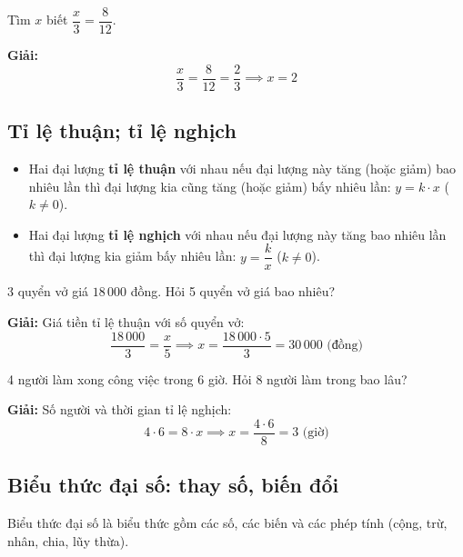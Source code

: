\documentclass[12pt,a4paper]{article}
\begin{document}
\begin{vidu}
Tìm $x$ biết $\dfrac{x}{3} = \dfrac{8}{12}$.

\textbf{Giải:}
\[
  \frac{x}{3} = \frac{8}{12} = \frac{2}{3} \implies x = 2
\]
\end{vidu}

\subsection{Tỉ lệ thuận; tỉ lệ nghịch}

\begin{dinhnghia}
\begin{itemize}
  \item Hai đại lượng \textbf{tỉ lệ thuận} với nhau nếu đại lượng này tăng (hoặc giảm) bao nhiêu lần thì đại lượng kia cũng tăng (hoặc giảm) bấy nhiêu lần: $y = k \cdot x$ \quad ($k \neq 0$).
  \item Hai đại lượng \textbf{tỉ lệ nghịch} với nhau nếu đại lượng này tăng bao nhiêu lần thì đại lượng kia giảm bấy nhiêu lần: $y = \dfrac{k}{x}$ \quad ($k \neq 0$).
\end{itemize}
\end{dinhnghia}

\begin{vidu}[title={Tỉ lệ thuận}]
3 quyển vở giá $18\,000$ đồng. Hỏi 5 quyển vở giá bao nhiêu?

\textbf{Giải:} Giá tiền tỉ lệ thuận với số quyển vở:
\[
  \frac{18\,000}{3} = \frac{x}{5} \implies x = \frac{18\,000 \cdot 5}{3} = 30\,000 \text{ (đồng)}
\]
\end{vidu}

\begin{vidu}[title={Tỉ lệ nghịch}]
4 người làm xong công việc trong 6 giờ. Hỏi 8 người làm trong bao lâu?

\textbf{Giải:} Số người và thời gian tỉ lệ nghịch:
\[
  4 \cdot 6 = 8 \cdot x \implies x = \frac{4 \cdot 6}{8} = 3 \text{ (giờ)}
\]
\end{vidu}

\subsection{Biểu thức đại số: thay số, biến đổi}

\begin{dinhnghia}
Biểu thức đại số là biểu thức gồm các số, các biến và các phép tính (cộng, trừ, nhân, chia, lũy thừa).
\end{dinhnghia}
\end{document}
